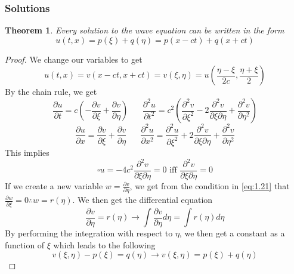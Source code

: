 \documentclass{article}
\newcommand{\pd}[2]{\frac{\partial #1}{\partial #2}}
\newcommand{\pdt}[2]{\frac{\partial ^2 #1}{\partial #2 ^2}}
\newtheorem{theorem}{Theorem}[section]
\theoremstyle{definition}
\begin{document}
\subsubsection{Solutions}
\begin{theorem}
    Every solution to the wave equation can be written in the form 
    \begin{equation*}
        u(t,x) = p(\xi)+q(\eta) = p(x-ct)+q(x+ct) \label{theorem:1.2}
    \end{equation*}
\end{theorem}
\begin{proof}
    We change our variables to get 
    \begin{equation*}
        u(t,x) = v(x-ct,x+ct)=v(\xi,\eta)=u\left(\frac{\eta - \xi}{2c}, \frac{\eta+\xi}{2}\right)
    \end{equation*}
    By the chain rule, we get
    \begin{equation}
        \pd{u}{t}=c\left(-\pd{v}{\xi}+\pd{v}{\eta}\right) \hspace{20pt} \pdt{u}{t} = c^2\left(\pdt{v}{\xi} - 2\frac{\partial^2v}{\partial \xi \partial\eta}+\pdt{v}{\eta}\right) \label{eq:1.19}
    \end{equation} %
    \begin{equation}
        \pd{u}{x} = \pd{v}{\xi}+\pd{v}{\eta} \hspace{20pt} \pdt{u}{x} = \pdt{u}{\xi}+2\frac{\partial^2v}{\partial\xi\partial\eta} + \pdt{v}{\eta} \label{eq:1.20}
    \end{equation} %
    This implies 
    \begin{equation}
        \square u=-4c^2\frac{\partial^2v}{\partial\xi\partial\eta}=0 \text{ iff } \frac{\partial^2v}{\partial\xi \partial\eta} = 0 \label{eq:1.21}
    \end{equation} %
    If we create a new variable $w=\pd{v}{\eta}$, we get from the condition in \eqref{eq:1.21} that $\pd{w}{\xi}=0 \therefore w=r(\eta)$. We then get the differential equation 
    \begin{equation*}
        \pd{v}{\eta} = r(\eta) \rightarrow\int\pd{v}{\eta}d\eta = \int r(\eta)d\eta
    \end{equation*}
    By performing the integration with respect to $\eta$, we then get a constant as a function of $\xi$ which leads to the following
    \begin{equation*}
        v(\xi,\eta) - p(\xi)=q(\eta) \rightarrow v(\xi,\eta)=p(\xi)+q(\eta)
    \end{equation*}
\end{proof}
\end{document}
